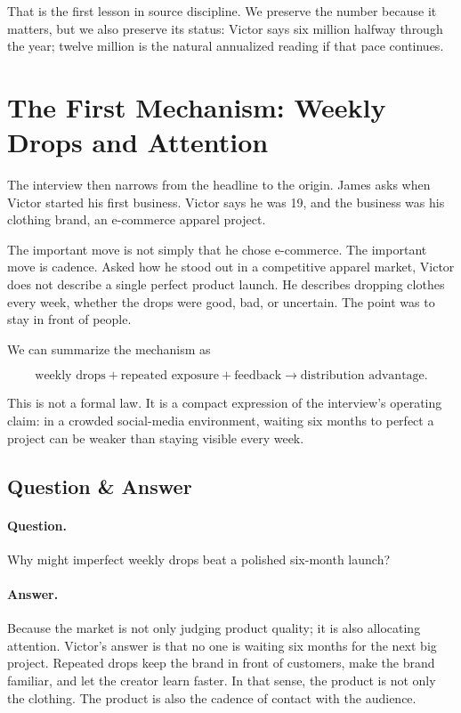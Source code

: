 That is the first lesson in source discipline. We preserve the number because it matters, but we also preserve its status: Victor says six million halfway through the year; twelve million is the natural annualized reading if that pace continues.

\section{The First Mechanism: Weekly Drops and Attention}

The interview then narrows from the headline to the origin. James asks when Victor started his first business. Victor says he was 19, and the business was his clothing brand, an e-commerce apparel project.

The important move is not simply that he chose e-commerce. The important move is cadence. Asked how he stood out in a competitive apparel market, Victor does not describe a single perfect product launch. He describes dropping clothes every week, whether the drops were good, bad, or uncertain. The point was to stay in front of people.

We can summarize the mechanism as

\begin{equation}
\text{weekly drops}
+
\text{repeated exposure}
+
\text{feedback}
\longrightarrow
\text{distribution advantage}.
\end{equation}

This is not a formal law. It is a compact expression of the interview's operating claim: in a crowded social-media environment, waiting six months to perfect a project can be weaker than staying visible every week.

\subsection{Question \& Answer}

\paragraph{Question.}
Why might imperfect weekly drops beat a polished six-month launch?

\paragraph{Answer.}
Because the market is not only judging product quality; it is also allocating attention. Victor's answer is that no one is waiting six months for the next big project. Repeated drops keep the brand in front of customers, make the brand familiar, and let the creator learn faster. In that sense, the product is not only the clothing. The product is also the cadence of contact with the audience.

